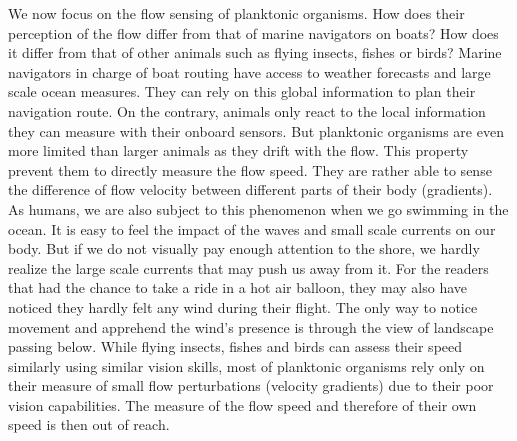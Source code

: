 We now focus on the flow sensing of planktonic organisms. 
How does their perception of the flow differ from that of marine navigators on boats?
How does it differ from that of other animals such as flying insects, fishes or birds?
Marine navigators in charge of boat routing have access to weather forecasts and large scale ocean measures.
They can rely on this global information to plan their navigation route.
On the contrary, animals only react to the local information they can measure with their onboard sensors.
But planktonic organisms are even more limited than larger animals as they drift with the flow.
This property prevent them to directly measure the flow speed.
They are rather able to sense the difference of flow velocity between different parts of their body (gradients).
As humans, we are also subject to this phenomenon when we go swimming in the ocean.
It is easy to feel the impact of the waves and small scale currents on our body.
But if we do not visually pay enough attention to the shore, we hardly realize the large scale currents that may push us away from it.
For the readers that had the chance to take a ride in a hot air balloon, they may also have noticed they hardly felt any wind during their flight.
The only way to notice movement and apprehend the wind's presence is through the view of landscape passing below.
While flying insects, fishes and birds can assess their speed similarly using similar vision skills, most of planktonic organisms rely only on their measure of small flow perturbations (velocity gradients) due to their poor vision capabilities.
The measure of the flow speed and therefore of their own speed is then out of reach.

